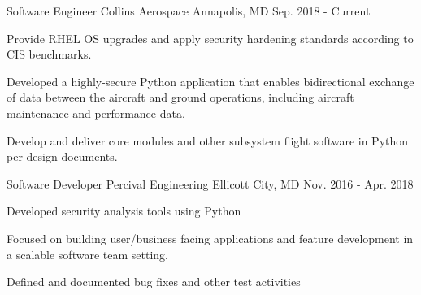 

\begin{cventries}

  \cventry
    {Software Engineer} %
    {Collins Aerospace} %
    {Annapolis, MD} %
    {Sep. 2018 - Current} %
    {
      \begin{cvitems} %
        \item {Provide RHEL OS upgrades and apply security hardening standards according to CIS benchmarks.}
        \item {Developed a highly-secure Python application that enables bidirectional exchange of data between the aircraft and ground operations, including aircraft maintenance and performance data.}
        \item {Develop and deliver core modules and other subsystem flight software in Python per design documents.}
      \end{cvitems}
    }

  \cventry
    {Software Developer} %
    {Percival Engineering} %
    {Ellicott City, MD} %
    {Nov. 2016 - Apr. 2018} %
    {
      \begin{cvitems} %
        \item {Developed security analysis tools using Python}
        \item {Focused on building user/business facing applications and feature development in a scalable software team setting.}
        \item {Defined and documented bug fixes and other test activities}
      \end{cvitems}
    }


\end{cventries}
